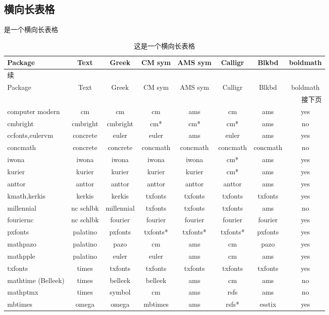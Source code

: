 \subsection{横向长表格}
 是一个横向长表格
\begin{landscape} 
\begin{spacing}{1}
	
	\begin{longtable}{lccccccc}	
		\caption{这是一个横向长表格}\label{tbl:long-tabu}\\
		\toprule
		Package&Text&Greek&CM sym&AMS sym&Calligr&Blkbd&boldmath\\
		\midrule
		\endfirsthead
		\multicolumn{8}{l}{\kaishu 续\tblref{tbl:long-tabu}} \\
		\toprule
		Package&Text&Greek&CM sym&AMS sym&Calligr&Blkbd&boldmath\\
		\midrule
		\endhead
		\midrule 
		\multicolumn{8}{r}{\kaishu 接下页} \\
		\endfoot
		\bottomrule
		\endlastfoot
		computer modern&cm&cm&cm&ams&cm&ams&yes\\
		cmbright&cmbright&cmbright&cm*&cm*&cm*&ams&no\\
		ccfonts,eulervm&concrete&euler&euler&ams&euler&ams&yes\\
		concmath&concrete&concrete&concmath&concmath&concmath&concmath&no\\
		iwona&iwona&iwona&iwona&iwona&cm*&ams&yes\\
		kurier&kurier&kurier&kurier&kurier&cm*&ams&yes\\
		anttor&anttor&anttor&anttor&anttor&anttor&ams&yes\\
		kmath,kerkis&kerkis&kerkis&txfonts&txfonts&txfonts&txfonts&yes\\
		millennial&nc schlbk&millennial&txfonts&txfonts&txfonts&ams&no\\
		fouriernc&nc schlbk&fourier&fourier&fourier&fourier&fourier&yes\\
		pxfonts&palatino&pxfonts&txfonts*&txfonts*&txfonts*&pxfonts&yes\\
		mathpazo&palatino&pazo&cm&ams&cm&pazo&yes\\
		mathpple&palatino&euler&euler&ams&cm&ams&yes\\
		txfonts&times&txfonts&txfonts&txfonts&txfonts&txfonts&yes\\
		mathtime (Belleek)&times&belleek&belleek&ams&cm&ams&no\\
		mathptmx&times&symbol&cm&ams&rsfs&ams&no\\
		mbtimes&omega&omega&mbtimes&ams&rsfs*&esstix&yes\\

\end{longtable}
\end{spacing}
\end{landscape}
